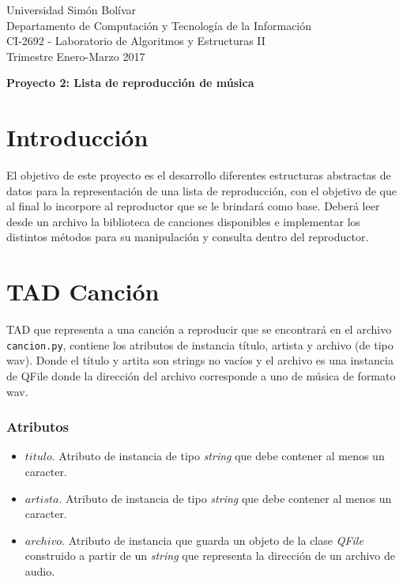 \documentclass[10pt, letterpaper]{article}
\begin{document}
\begin{flushleft}
{\small
Universidad Simón Bolívar\\
Departamento de Computación y Tecnología de la Información\\
CI-2692 - Laboratorio de Algoritmos y Estructuras II\\
Trimestre Enero-Marzo 2017
}
\end{flushleft}

\vspace{1.5em}
\begin{center}
{\LARGE
\textbf{
Proyecto 2: Lista de reproducción de música
}}
\end{center}
\vspace{1em}

\section*{Introducción}
El objetivo de este proyecto es el desarrollo diferentes estructuras abstractas de datos para la representación de una lista de reproducción, con el objetivo de que al final lo incorpore al reproductor que se le brindará como base. Deberá leer desde un archivo la biblioteca de canciones disponibles e implementar los distintos métodos para su manipulación y consulta dentro del reproductor.

\section*{TAD Canción}
TAD que representa a una canción a reproducir que se encontrará en el archivo \texttt{cancion.py}, contiene los atributos de instancia título, artista y archivo (de tipo wav). Donde el título y artita son strings no vacíos y el archivo es una instancia de QFile donde la dirección del archivo corresponde a uno de música de formato wav.

\subsubsection*{Atributos}
\begin{itemize}
    \item $titulo$. Atributo de instancia de tipo \textit{string} que debe contener al menos un caracter.
    \item $artista$. Atributo de instancia de tipo \textit{string} que debe contener al menos un caracter.
    \item $archivo$. Atributo de instancia que guarda un objeto de la clase \textit{QFile} construido a partir de un \textit{string} que representa la dirección de un archivo de audio.
\end{itemize}
\end{document}
